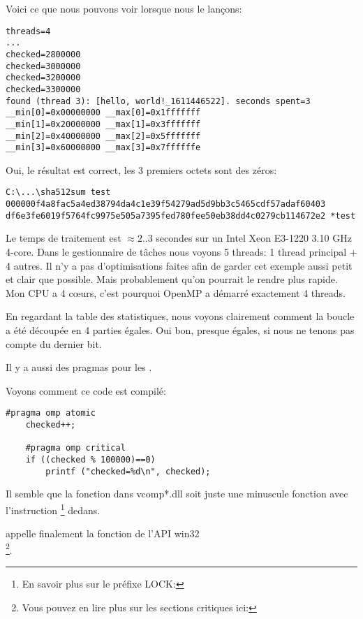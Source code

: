 Voici ce que nous pouvons voir lorsque nous le lançons:

\begin{lstlisting}
threads=4
...
checked=2800000
checked=3000000
checked=3200000
checked=3300000
found (thread 3): [hello, world!_1611446522]. seconds spent=3
__min[0]=0x00000000 __max[0]=0x1fffffff
__min[1]=0x20000000 __max[1]=0x3fffffff
__min[2]=0x40000000 __max[2]=0x5fffffff
__min[3]=0x60000000 __max[3]=0x7ffffffe
\end{lstlisting}

Oui, le résultat est correct, les 3 premiers octets sont des zéros:

\begin{lstlisting}
C:\...\sha512sum test
000000f4a8fac5a4ed38794da4c1e39f54279ad5d9bb3c5465cdf57adaf60403
df6e3fe6019f5764fc9975e505a7395fed780fee50eb38dd4c0279cb114672e2 *test
\end{lstlisting}

Le temps de traitement est $\approx2..3$ secondes sur un Intel Xeon E3-1220 3.10 GHz 4-core.
Dans le gestionnaire de tâches nous voyons 5 threads:
1 thread principal + 4 autres.
Il n'y a pas d'optimisations faites afin de garder cet exemple aussi petit et clair
que possible.
Mais probablement qu'on pourrait le rendre plus rapide.
Mon \ac{CPU} a 4 c\oe{}urs, c'est pourquoi OpenMP a démarré exactement 4 threads.

En regardant la table des statistiques, nous voyons clairement comment la boucle
a été découpée en 4 parties égales.
Oui bon, presque égales, si nous ne tenons pas compte du dernier bit.

Il y a aussi des pragmas pour les .

Voyons comment ce code est compilé:

\begin{lstlisting}[style=customc]
	#pragma omp atomic
	checked++;

	#pragma omp critical
	if ((checked % 100000)==0)
		printf ("checked=%d\n", checked);
\end{lstlisting}



Il semble que la fonction  dans vcomp*.dll soit juste
une minuscule fonction avec l'instruction \footnote{En savoir plus sur le préfixe LOCK: }
dedans.

appelle finalement la fonction de l'\ac{API} win32 \\
\footnote{Vous pouvez en lire plus sur les sections critiques ici: }.

